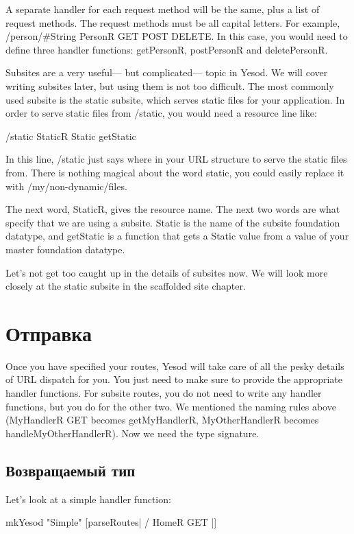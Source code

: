 A separate handler for each request method will be the same, plus a
list of request methods. The request methods must be all capital
letters. For example, /person/#String PersonR GET POST DELETE. In this
case, you would need to define three handler functions: getPersonR,
postPersonR and deletePersonR.

Subsites are a very useful— but complicated— topic in Yesod. We will
cover writing subsites later, but using them is not too difficult. The
most commonly used subsite is the static subsite, which serves static
files for your application. In order to serve static files from
/static, you would need a resource line like:

/static StaticR Static getStatic

In this line, /static just says where in your URL structure to serve
the static files from. There is nothing magical about the word static,
you could easily replace it with /my/non-dynamic/files.

The next word, StaticR, gives the resource name. The next two words
are what specify that we are using a subsite. Static is the name of
the subsite foundation datatype, and getStatic is a function that gets
a Static value from a value of your master foundation datatype.

Let's not get too caught up in the details of subsites now. We will
look more closely at the static subsite in the scaffolded site
chapter.

\section{Отправка}
Once you have specified your routes, Yesod will take care of all the
pesky details of URL dispatch for you. You just need to make sure to
provide the appropriate handler functions. For subsite routes, you do
not need to write any handler functions, but you do for the other
two. We mentioned the naming rules above (MyHandlerR GET becomes
getMyHandlerR, MyOtherHandlerR becomes handleMyOtherHandlerR). Now we
need the type signature.

\subsection{Возвращаемый тип}

Let's look at a simple handler function:

mkYesod "Simple" [parseRoutes|
/ HomeR GET
|]

